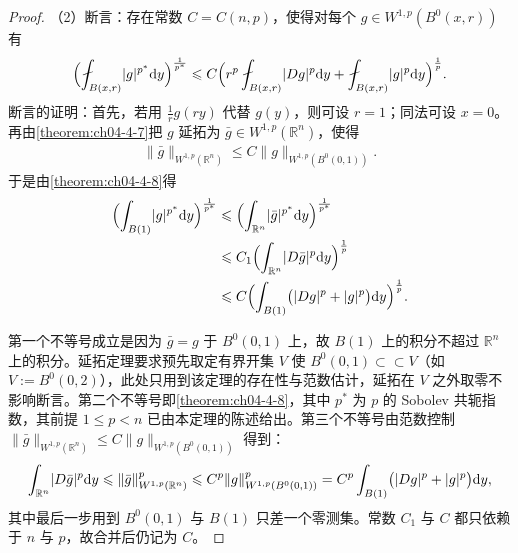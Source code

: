 \documentclass[../../main.tex]{subfiles}%
\begin{document}
\begin{proof}
（2）断言：存在常数 $C=C(n,p)$，使得对每个 $g\in W^{1,p}(B^{0}(x,r))$ 有
\begin{align*}
\Bigl(\fint_{B(x,r)}\lvert g\rvert^{p^*}\diff y\Bigr)^{\frac{1}{p^*}}\leqslant C\Bigl(r^{p}\fint_{B(x,r)}\lvert Dg\rvert^{p}\diff y+\fint_{B(x,r)}\lvert g\rvert^{p}\diff y\Bigr)^{\frac{1}{p}}.
\end{align*}
断言的证明：首先，若用 $\frac{1}{r}g(ry)$ 代替 $g(y)$，则可设 $r=1$；同法可设 $x=0$。再由\cref{theorem:ch04-4-7}把 $g$ 延拓为 $\bar g\in W^{1,p}(\mathbb{R}^n)$，使得%
\begin{align*}
\lVert\bar g\rVert_{W^{1,p}(\mathbb{R}^n)}\leqslant C\lVert g\rVert_{W^{1,p}(B^{0}(0,1))}.
\end{align*}
于是由\cref{theorem:ch04-4-8}得%
\begin{align*}
\Bigl(\int_{B(1)}\lvert g\rvert^{p^*}\mathrm{d} y\Bigr)^{\frac{1}{p^*}}
&\leqslant\Bigl(\int_{\mathbb{R}^n}\lvert\bar g\rvert^{p^*}\mathrm{d} y\Bigr)^{\frac{1}{p^*}}\\
&\leqslant C_1\Bigl(\int_{\mathbb{R}^n}\lvert D\bar g\rvert^{p}\mathrm{d} y\Bigr)^{\frac{1}{p}}\\
&\leqslant C\Bigl(\int_{B(1)}\bigl(\lvert Dg\rvert^{p}+\lvert g\rvert^{p}\bigr)\mathrm{d} y\Bigr)^{\frac{1}{p}}.
\end{align*}

第一个不等号成立是因为 $\bar g=g$ 于 $B^{0}(0,1)$ 上，故 $B(1)$ 上的积分不超过 $\mathbb{R}^n$ 上的积分。延拓定理要求预先取定有界开集 $V$ 使 $B^{0}(0,1)\subset\subset V$（如 $V:=B^{0}(0,2)$），此处只用到该定理的存在性与范数估计，延拓在 $V$ 之外取零不影响断言。第二个不等号即\cref{theorem:ch04-4-8}，其中 $p^*$ 为 $p$ 的 Sobolev 共轭指数，其前提 $1\leqslant p<n$ 已由本定理的陈述给出。第三个不等号由范数控制 $\lVert\bar g\rVert_{W^{1,p}(\mathbb{R}^n)}\leqslant C\lVert g\rVert_{W^{1,p}(B^{0}(0,1))}$ 得到：%
\begin{align*}
\int_{\mathbb{R}^n}\lvert D\bar g\rvert^{p}\mathrm{d} y\leqslant\lVert\bar g\rVert_{W^{1,p}(\mathbb{R}^n)}^{p}\leqslant C^{p}\lVert g\rVert_{W^{1,p}(B^{0}(0,1))}^{p}=C^{p}\int_{B(1)}\bigl(\lvert Dg\rvert^{p}+\lvert g\rvert^{p}\bigr)\mathrm{d} y,
\end{align*}
其中最后一步用到 $B^{0}(0,1)$ 与 $B(1)$ 只差一个零测集。常数 $C_1$ 与 $C$ 都只依赖于 $n$ 与 $p$，故合并后仍记为 $C$。


\end{proof}
\end{document}

